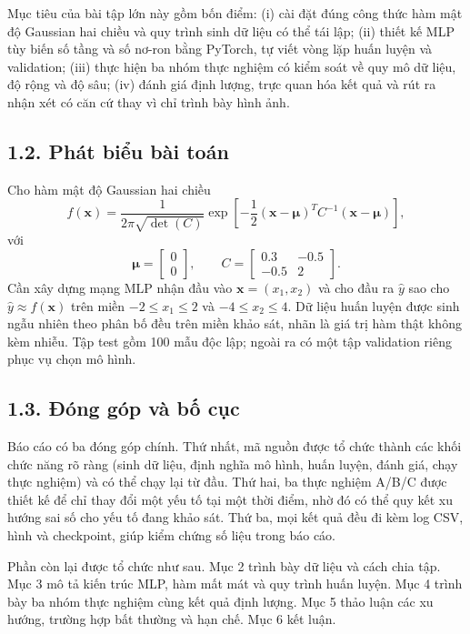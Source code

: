 \documentclass[12pt,a4paper]{article}
\begin{document}
Mục tiêu của bài tập lớn này gồm bốn điểm: (i) cài đặt đúng công thức hàm mật độ Gaussian hai chiều và quy trình sinh dữ liệu có thể tái lập; (ii) thiết kế MLP tùy biến số tầng và số nơ-ron bằng PyTorch, tự viết vòng lặp huấn luyện và validation; (iii) thực hiện ba nhóm thực nghiệm có kiểm soát về quy mô dữ liệu, độ rộng và độ sâu; (iv) đánh giá định lượng, trực quan hóa kết quả và rút ra nhận xét có căn cứ thay vì chỉ trình bày hình ảnh.

\subsection{1.2. Phát biểu bài toán}

Cho hàm mật độ Gaussian hai chiều
$$f(\mathbf{x}) = \frac{1}{2\pi\sqrt{\det(C)}} \exp\left[-\frac{1}{2}(\mathbf{x}-\boldsymbol{\mu})^T C^{-1}(\mathbf{x}-\boldsymbol{\mu})\right],$$
với
$$\boldsymbol{\mu} = \begin{bmatrix}0\\0\end{bmatrix}, \qquad C = \begin{bmatrix}0.3 & -0.5\\ -0.5 & 2\end{bmatrix}.$$
Cần xây dựng mạng MLP nhận đầu vào $\mathbf{x} = (x_1, x_2)$ và cho đầu ra $\hat{y}$ sao cho $\hat{y} \approx f(\mathbf{x})$ trên miền $-2 \le x_1 \le 2$ và $-4 \le x_2 \le 4$. Dữ liệu huấn luyện được sinh ngẫu nhiên theo phân bố đều trên miền khảo sát, nhãn là giá trị hàm thật không kèm nhiễu. Tập test gồm 100 mẫu độc lập; ngoài ra có một tập validation riêng phục vụ chọn mô hình.

\subsection{1.3. Đóng góp và bố cục}

Báo cáo có ba đóng góp chính. Thứ nhất, mã nguồn được tổ chức thành các khối chức năng rõ ràng (sinh dữ liệu, định nghĩa mô hình, huấn luyện, đánh giá, chạy thực nghiệm) và có thể chạy lại từ đầu. Thứ hai, ba thực nghiệm A/B/C được thiết kế để chỉ thay đổi một yếu tố tại một thời điểm, nhờ đó có thể quy kết xu hướng sai số cho yếu tố đang khảo sát. Thứ ba, mọi kết quả đều đi kèm log CSV, hình và checkpoint, giúp kiểm chứng số liệu trong báo cáo.

Phần còn lại được tổ chức như sau. Mục 2 trình bày dữ liệu và cách chia tập. Mục 3 mô tả kiến trúc MLP, hàm mất mát và quy trình huấn luyện. Mục 4 trình bày ba nhóm thực nghiệm cùng kết quả định lượng. Mục 5 thảo luận các xu hướng, trường hợp bất thường và hạn chế. Mục 6 kết luận.
\end{document}
